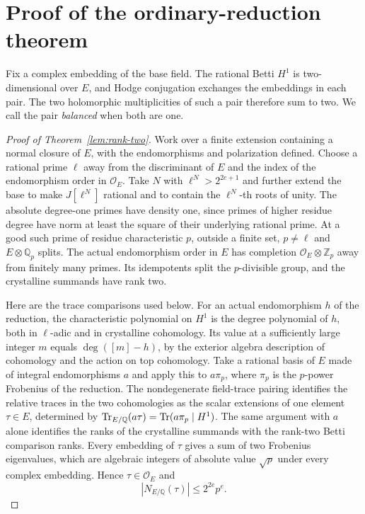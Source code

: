\section{Proof of the ordinary-reduction theorem}\label{sec:ordinarity}

Fix a complex embedding of the base field. The rational Betti \(H^1\) is
two-dimensional over \(E\), and Hodge conjugation exchanges the embeddings
in each pair. The two holomorphic multiplicities of such a pair therefore
sum to two. We call the pair \emph{balanced} when both are one.

\begin{proof}[Proof of Theorem~\ref{lem:rank-two}]
Work over a finite extension containing a normal closure of \(E\), with the
endomorphisms and polarization defined. Choose a rational prime \(\ell\)
away from the discriminant of \(E\) and the index of the endomorphism
order in \(\mathcal O_E\). Take \(N\) with \(\ell^N>2^{2e+1}\) and further
extend the base to make \(J[\ell^N]\) rational and to contain the
\(\ell^N\)-th roots of unity. The absolute degree-one primes have density one,
since primes of higher residue degree have norm at least the square of
their underlying rational prime.
At a good such prime of residue characteristic \(p\), outside a finite
set, \(p\ne\ell\) and \(E\otimes\mathbb Q_p\) splits. The actual
endomorphism order in \(E\) has completion \(\mathcal O_E\otimes\mathbb Z_p\)
away from finitely many primes. Its idempotents split the \(p\)-divisible
group, and the crystalline summands have rank two.

Here are the trace comparisons used below. For an actual endomorphism
\(h\) of the reduction, the characteristic polynomial on \(H^1\) is
the degree polynomial of \(h\), both in \(\ell\)-adic and in crystalline
cohomology. Its value at a sufficiently large integer \(m\) equals
\(\deg([m]-h)\), by the exterior algebra description of cohomology
and the action on top cohomology. Take a rational basis of \(E\) made
of integral endomorphisms \(a\) and apply this to \(a\pi_p\), where
\(\pi_p\) is the \(p\)-power Frobenius of the reduction. The
nondegenerate field-trace pairing identifies the relative traces in
the two cohomologies as the scalar extensions of one element
\(\tau\in E\), determined by
\(\operatorname{Tr}_{E/\mathbb Q}(a\tau)=\operatorname{Tr}(a\pi_p\mid H^1)\).
The same argument with \(a\) alone identifies the ranks of the
crystalline summands with the rank-two Betti comparison ranks.
Every embedding of \(\tau\) gives a sum of two Frobenius eigenvalues,
which are algebraic integers of absolute value \(\sqrt p\) under
every complex embedding. Hence \(\tau\in\mathcal O_E\) and
\[
                             |N_{E/\mathbb Q}(\tau)|\leq 2^{2e}p^e.
\]


\end{proof}
